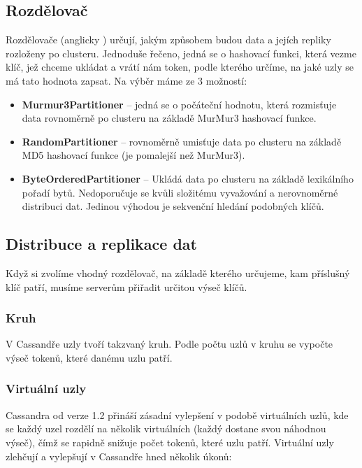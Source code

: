 \subsection{Rozdělovač}
Rozdělovače (anglicky ) určují, jakým způsobem budou data a jejích repliky rozloženy po clusteru. Jednoduše řečeno, jedná se o hashovací funkci, která vezme klíč, jež chceme ukládat a vrátí nám token, podle kterého určíme, na jaké uzly se má tato hodnota zapsat. Na výběr máme ze 3 možností:

\begin{itemize}
\item \textbf{Murmur3Partitioner} – jedná se o počáteční hodnotu, která rozmisťuje data rovnoměrně po clusteru na základě MurMur3 hashovací funkce.
\item \textbf{RandomPartitioner} – rovnoměrně umisťuje data po clusteru na základě MD5 hashovací funkce (je pomalejší než MurMur3).
\item \textbf{ByteOrderedPartitioner} –  Ukládá data po clusteru na základě lexikálního pořadí bytů. Nedoporučuje se kvůli složitému vyvažování a nerovnoměrné distribuci dat. Jedinou výhodou je sekvenční hledání podobných klíčů.
\end{itemize}

\subsection{Distribuce a replikace dat}
Když si zvolíme vhodný rozdělovač, na základě kterého určujeme, kam příslušný klíč patří, musíme serverům přiřadit určitou výseč klíčů. 

\subsubsection{Kruh}
V Cassandře uzly tvoří takzvaný kruh. Podle počtu uzlů v kruhu se vypočte výseč tokenů, které danému uzlu patří. 

\subsubsection{Virtuální uzly}
Cassandra od verze 1.2 přináší zásadní vylepšení v podobě virtuálních uzlů, kde se každý uzel rozdělí na několik virtuálních (každý dostane svou náhodnou výseč), čímž se rapidně snižuje počet tokenů, které uzlu patří. Virtuální uzly zlehčují a vylepšují v Cassandře hned několik úkonů:

